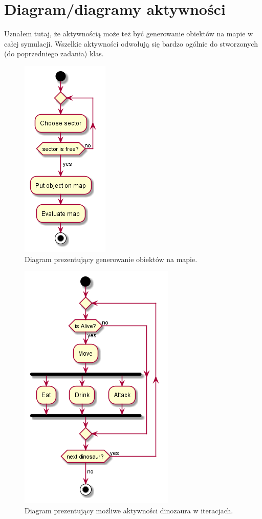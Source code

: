 \section{Diagram/diagramy aktywności}
Uznałem tutaj, że aktywnością może też być generowanie obiektów na mapie w całej symulacji. Wszelkie aktywności odwołują się bardzo ogólnie do stworzonych (do poprzedniego zadania) klas.
\begin{figure}[h]
    \centering
    \includegraphics[scale=0.58]{images/activity/activity_generating.png}
    \caption{Diagram prezentujący generowanie obiektów na mapie.}
    \label{fig:agenerating}
\end{figure}

\begin{figure}[h]
    \centering
    \includegraphics[scale=0.58]{images/activity/activity_interation.png}
    \caption{Diagram prezentujący możliwe aktywności dinozaura w iteracjach.}
    \label{fig:aiteration}
\end{figure}

